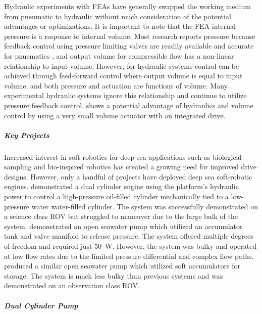 Hydraulic experiments with \glspl{FEA} have generally swapped the working medium 
from pneumatic to hydraulic without much consideration of the potential advantages or optimizations. 
It is important to note that the \gls{FEA} internal pressure is a response to internal volume. Most research reports pressure because feedback control using pressure limiting
valves are readily available and accurate for pnuematics \cite{chen2021water}, 
and output volume for compressible flow has a non-linear relationship to input
volume. However, for hydraulic systems control can be achieved through
feed-forward control where output volume is equal to input
volume, and both pressure and actuation are functions of volume. Many
experimental hydraulic systems ignore this relationship and continue to
utilize pressure feedback control. \textcite{chen2021water} shows a potential advantage
of hydraulics and volume control by using a very small volume actuator
with an integrated drive.

\hypertarget{ch1:key-projects}{%
\subparagraph{Key Projects}\label{ch1:key-projects}}

Increased interest in soft robotics for deep-sea applications such as
biological sampling \cite{galloway2016soft,licht2016universal,licht2017stronger,phillips2018dexterous} and bio-inspired
robotics \cite{ahmed2022decade,li2023bioinspired} has created a growing need for improved drive
designs. However, only a handful of projects have deployed deep sea soft-robotic
engines. \textcite{galloway2016soft} demonstrated a dual cylinder engine using
the platform's hydraulic power to control a high-pressure oil-filled
cylinder mechanically tied to a low-pressure water water-filled
cylinder. The system was successfully demonstrated on a science class \gls{ROV}
\cite{licht2017stronger} but struggled to maneuver due to the large bulk of the system.
\textcite{phillips2018dexterous} demonstrated an open seawater pump which utilized an accumulator tank and valve manifold to release pressure. The
system offered multiple degrees of freedom and required just
\SI{50}{\watt}. However, the system was bulky and operated at low flow
rates due to the limited pressure differential and complex flow paths. \textcite{shen2020underwater} produced a similar open seawater pump which  utilized soft accumulators for storage. The system is much less bulky
than previous systems and was demonstrated on an observation class \gls{ROV}.

\hypertarget{ch1:dual-cylinder-pump}{%
\subparagraph{Dual Cylinder Pump}\label{ch1:dual-cylinder-pump}}



